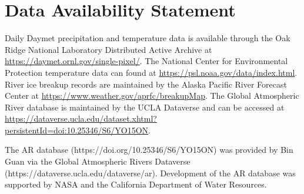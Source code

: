 \documentclass[12pts,draft]{AR_analysis_}
\begin{document}
%
%

\section*{Data Availability Statement}
Daily Daymet precipitation and temperature data is available through the Oak Ridge 
National Laboratory Distributed Active Archive at \url{https://daymet.ornl.gov/single-pixel/}.
The National Center for Environmental Protection temperature data can found at
\url{https://psl.noaa.gov/data/index.html}.
River ice breakup records are maintained by the Alaska Pacific River Forecast Center 
at \url{https://www.weather.gov/aprfc/breakupMap}. The Global Atmospheric River 
database is maintained by the UCLA Dataverse and can be accessed at 
\url{https://dataverse.ucla.edu/dataset.xhtml?persistentId=doi:10.25346/S6/YO15ON}.




\acknowledgments
The AR database (https://doi.org/10.25346/S6/YO15ON) was provided by 
Bin Guan via the Global Atmospheric Rivers Dataverse 
(https://dataverse.ucla.edu/dataverse/ar). Development 
of the AR database was supported by NASA and the California 
Department of Water Resources.


%
%

%



%
%
%
%
%
\end{document}

